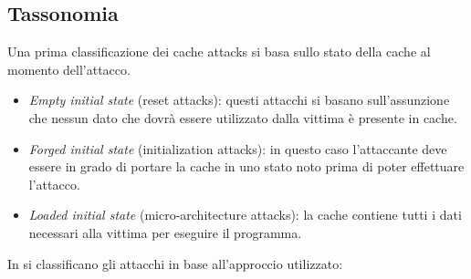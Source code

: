 		\subsection{Tassonomia}
			Una prima classificazione dei cache attacks si basa sullo stato della cache al momento dell'attacco\cite{canteaut2006understanding}.
			
			\begin{itemize}
				\item \emph{Empty initial state} (reset attacks): questi attacchi si basano sull'assunzione che nessun dato che dovrà essere utilizzato dalla vittima è presente in cache.
				\item \emph{Forged initial state} (initialization attacks): in questo caso l'attaccante deve essere in grado di portare la cache in uno stato noto prima di poter effettuare l'attacco.
				\item \emph{Loaded initial state} (micro-architecture attacks): la cache contiene tutti i dati necessari alla vittima per eseguire il programma.
			\end{itemize}
			
			In \cite{lipp2016armageddon,ge2016survey} si classificano gli attacchi in base all'approccio utilizzato:
			
